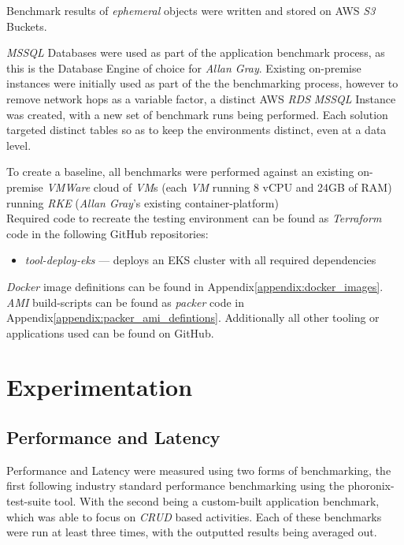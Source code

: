 Benchmark results of \emph{ephemeral} objects were written and stored on AWS \emph{S3} Buckets.

\emph{MSSQL} Databases were used as part of the application benchmark process, as this is the Database Engine of choice for \emph{Allan Gray}.
Existing on-premise instances were initially used as part of the the benchmarking process, however to remove network hops as a variable factor,
a distinct AWS \emph{RDS} \emph{MSSQL} Instance was created, with a new set of benchmark runs being performed.
Each solution targeted distinct tables so as to keep the environments distinct, even at a data level.

To create a baseline, all benchmarks were performed against an existing on-premise \emph{VMWare} cloud of \emph{VM}s (each \textit{VM} running 8 vCPU and 24GB of RAM) running \emph{RKE} (\emph{Allan Gray}'s existing container-platform) \\

\noindent Required code to recreate the testing environment can be found as \emph{Terraform} code in the following GitHub repositories:
\begin{itemize}
      \item \emph{tool-deploy-eks}\cite{thameezb_2022} --- deploys an EKS cluster with all required dependencies
\end{itemize}
\emph{Docker} image definitions can be found in Appendix\ref{appendix:docker_images}.
\emph{AMI} build-scripts can be found as \emph{packer} code in Appendix\ref{appendix:packer_ami_defintions}.
Additionally all other tooling or applications used can be found on GitHub\cite{bodhanya_2022}.

\chapter{Experimentation}
\section{Performance and Latency}
Performance and Latency were measured using two forms of benchmarking, the first following industry standard performance benchmarking using the phoronix-test-suite\cite{phoronix_test_suite} tool.
With the second being a custom-built application benchmark, which was able to focus on \emph{CRUD} based activities.
Each of these benchmarks were run at least three times, with the outputted results being averaged out.

